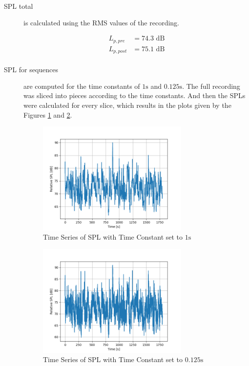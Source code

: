 \documentclass[twocolumn]{article}
\begin{document}
\begin{description}
\item[SPL total] is calculated using the RMS values of the recording.

\begin{equation}
\begin{aligned}
    L_{p,pre} & = 74.3 \textrm{ dB} \\
    L_{p,post} & = 75.1 \textrm{ dB} \\
\end{aligned}
\end{equation}

\item[SPL for sequences] are computed for the time constants of $1\textrm{s}$ and $0.125\textrm{s}$.
    The full recording was sliced into pieces according to the time constants.
    And then the SPLs were calculated for every slice, which results in the plots given by the Figures
    \ref{fig:time_constant_1s} and \ref{fig:time_constant_125ms}.

\begin{figure}
    \centering
    \includegraphics[width=75mm]{./Images/time_constant_spl_1s.png}
    \caption{Time Series of SPL with Time Constant set to $1\textrm{s}$}
    \label{fig:time_constant_1s}
\end{figure}

\begin{figure}
    \centering
    \includegraphics[width=75mm]{./Images/time_constant_spl_125ms.png}
    \caption{Time Series of SPL with Time Constant set to $0.125\textrm{s}$}
    \label{fig:time_constant_125ms}
\end{figure}


\end{description}
\end{document}
